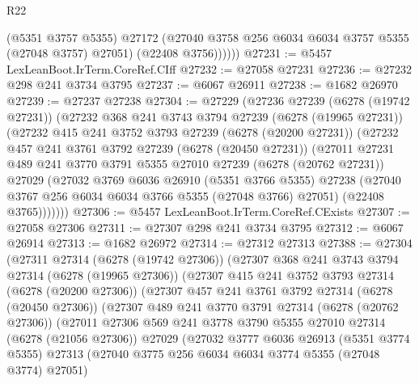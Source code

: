 \begin{lexlean}{R22}
\begin{coremodule}
              (@5351 @3757 @5355)
              @27172
              (@27040 @3758 @256 @6034 @6034 @3757 @5355 (@27048 @3757) @27051)
              (@22408 @3756))))))
@27231 := @5457 LexLeanBoot.IrTerm.CoreRef.CIff
@27232 := @27058 @27231
@27236 := @27232 @298 @241 @3734 @3795
@27237 := @6067 @26911
@27238 := @1682 @26970
@27239 := @27237 @27238
@27304 := @27229
    (@27236
      @27239
      (@6278 (@19742 @27231))
      (@27232
        @368
        @241
        @3743
        @3794
        @27239
        (@6278 (@19965 @27231))
        (@27232
          @415
          @241
          @3752
          @3793
          @27239
          (@6278 (@20200 @27231))
          (@27232
            @457
            @241
            @3761
            @3792
            @27239
            (@6278 (@20450 @27231))
            (@27011
              @27231
              @489
              @241
              @3770
              @3791
              @5355
              @27010
              @27239
              (@6278 (@20762 @27231))
              @27029
              (@27032
                @3769
                @6036
                @26910
                (@5351 @3766 @5355)
                @27238
                (@27040 @3767 @256 @6034 @6034 @3766 @5355 (@27048 @3766) @27051)
                (@22408 @3765)))))))
@27306 := @5457 LexLeanBoot.IrTerm.CoreRef.CExists
@27307 := @27058 @27306
@27311 := @27307 @298 @241 @3734 @3795
@27312 := @6067 @26914
@27313 := @1682 @26972
@27314 := @27312 @27313
@27388 := @27304
    (@27311
      @27314
      (@6278 (@19742 @27306))
      (@27307
        @368
        @241
        @3743
        @3794
        @27314
        (@6278 (@19965 @27306))
        (@27307
          @415
          @241
          @3752
          @3793
          @27314
          (@6278 (@20200 @27306))
          (@27307
            @457
            @241
            @3761
            @3792
            @27314
            (@6278 (@20450 @27306))
            (@27307
              @489
              @241
              @3770
              @3791
              @27314
              (@6278 (@20762 @27306))
              (@27011
                @27306
                @569
                @241
                @3778
                @3790
                @5355
                @27010
                @27314
                (@6278 (@21056 @27306))
                @27029
                (@27032
                  @3777
                  @6036
                  @26913
                  (@5351 @3774 @5355)
                  @27313
                  (@27040 @3775 @256 @6034 @6034 @3774 @5355 (@27048 @3774) @27051)

\end{coremodule}
\end{lexlean}
